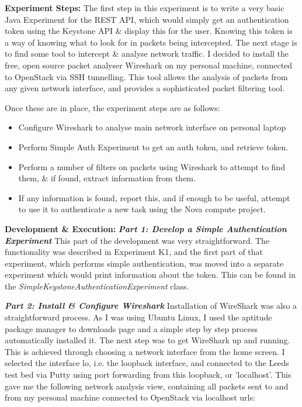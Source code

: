 \textbf{Experiment Steps:}
The first step in this experiment is to write a very basic Java Experiment for the REST API, which would simply get an authentication token using the Keystone API \& display this for the user. Knowing this token is a way of knowing what to look for in packets being intercepted. 
The next stage is to find some tool to intercept \& analyse network traffic. I decided to install the free, open source packet analyser Wireshark\cite{wireshark} on my personal machine, connected to OpenStack via SSH tunnelling. This tool allows the analysis of packets from any given network interface, and provides a sophisticated packet filtering tool. 

Once these are in place, the experiment steps are as follows:
\begin{itemize}
\itemsep0em
\item Configure Wireshark to analyse main network interface on personal laptop
\item Perform Simple Auth Experiment to get an auth token, and retrieve token.
\item Perform a number of filters on packets using Wireshark to attempt to find them, \& if found, extract information from them.
\item If any information is found, report this, and if enough to be useful, attempt to use it to authenticate a new task using the Nova compute project. 
\end{itemize} 

\textbf{Development \& Execution:}
\textbf{\textit{Part 1: Develop a Simple Authentication Experiment}}
This part of the development was very straightforward. The functionality was described in Experiment K1, and the first part of that experiment, which performs simple authentication, was moved into a separate experiment which would print information about the token. This can be found in the \textit{SimpleKeystoneAuthenticationExperiment} class. 

\textbf{\textit{Part 2: Install \& Configure Wireshark}}
Installation of WireShark was also a straightforward process. As I was using Ubuntu Linux, I used the aptitude package manager\cite{aptitude} to downloads page\cite{wireshark} and a simple step by step process automatically installed it.
The next step was to get WireShark up and running. This is achieved through choosing a network interface from the home screen. I selected the interface lo, i.e. the loopback interface, and connected to the Leeds test bed via Putty\cite{putty} using port forwarding from this loopback, or 'localhost'. This gave me the following network analysis view, containing all packets sent to and from my personal machine connected to OpenStack via localhost urls:

